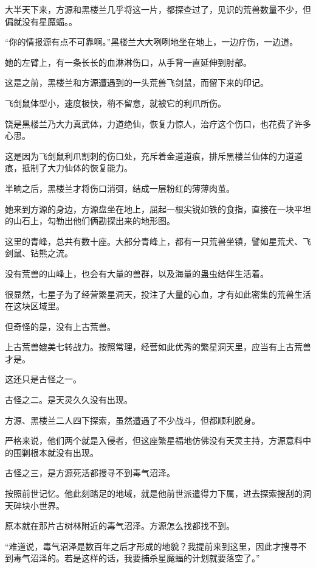 
\begin{this_body}

大半天下来，方源和黑楼兰几乎将这一片，都探查过了，见识的荒兽数量不少，但偏就没有星魔蝠。。

“你的情报源有点不可靠啊。”黑楼兰大大咧咧地坐在地上，一边疗伤，一边道。

她的左臂上，有一条长长的血淋淋伤口，从手背一直延伸到肘部。

这是之前，黑楼兰和方源遭遇到的一头荒兽飞剑鼠，而留下来的印记。

飞剑鼠体型小，速度极快，稍不留意，就被它的利爪所伤。

饶是黑楼兰乃大力真武体，力道绝仙，恢复力惊人，治疗这个伤口，也花费了许多心思。

这是因为飞剑鼠利爪割刺的伤口处，充斥着金道道痕，排斥黑楼兰仙体的力道道痕，抵制了大力仙体的恢复能力。

半晌之后，黑楼兰才将伤口消弭，结成一层粉红的薄薄肉茧。

她来到方源的身边，方源盘坐在地上，屈起一根尖锐如铁的食指，直接在一块平坦的山石上，勾勒出他们俩勘探出来的地形图。

这里的青峰，总共有数十座。大部分青峰上，都有一只荒兽坐镇，譬如星荒犬、飞剑鼠、钻熊之流。

没有荒兽的山峰上，也会有大量的兽群，以及海量的蛊虫结伴生活着。

很显然，七星子为了经营繁星洞天，投注了大量的心血，才有如此密集的荒兽生活在这块区域里。

但奇怪的是，没有上古荒兽。

上古荒兽媲美七转战力。按照常理，经营如此优秀的繁星洞天里，应当有上古荒兽才是。

这还只是古怪之一。

古怪之二。是天灵久久没有出现。

方源、黑楼兰二人四下探索，虽然遭遇了不少战斗，但都顺利脱身。

严格来说，他们两个就是入侵者，但这座繁星福地仿佛没有天灵主持，方源意料中的围剿根本就没有出现。

古怪之三，是方源死活都搜寻不到毒气沼泽。

按照前世记忆。他此刻踏足的地域，就是他前世派遣得力下属，进去探索搜刮的洞天碎块小世界。

原本就在那片古树林附近的毒气沼泽。方源怎么找都找不到。

“难道说，毒气沼泽是数百年之后才形成的地貌？我提前来到这里，因此才搜寻不到毒气沼泽的。若是这样的话，我要捕杀星魔蝠的计划就要落空了。”


\end{this_body}
